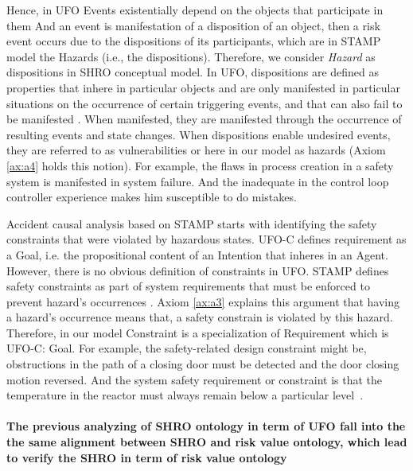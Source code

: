 \documentclass[sw]{iosart2x}
\newcommand{\COMMENT}[1]{\hl{ \textnormal{#1}}}
\newcommand{\COMMENT}[2]{\hl{ \textnormal{#1} \textbf{comment:} \textit{#2}}\xspace}
\newcommand{\term}[1]{\textnormal{\textsf{#1}}}
\begin{document}
Hence, in UFO Events existentially depend on the objects that participate in them And an event is manifestation of a disposition of an object, then a risk event occurs due to the dispositions of its participants, which are in STAMP model the \term{Hazards} (i.e., the dispositions). Therefore, we consider \emph{Hazard} as dispositions in SHRO conceptual model. In UFO, dispositions are defined as properties that inhere in particular objects and are only manifested in particular situations on the occurrence of certain triggering events, and that can also fail to be manifested \cite{Guizzardi2014}. When manifested, they are manifested through the occurrence of resulting events and state changes. When dispositions enable undesired events, they are referred to as vulnerabilities or here in our model as hazards (Axiom \ref{ax:a4} holds this notion). For example, the flaws in process creation in a safety system is manifested in system failure. And the inadequate in the control loop controller experience makes him susceptible to do mistakes. 

Accident causal analysis based on STAMP starts with identifying the safety constraints that were violated by hazardous states. \term{UFO-C} \cite{Guizzardi2010a} defines requirement as a Goal, i.e. the propositional content of an Intention that inheres in an Agent. However, there is no obvious definition of constraints in UFO. STAMP defines safety constraints as part of system requirements that must be enforced to prevent hazard's occurrences \cite{leveson2012engineering}. Axiom \ref{ax:a3} explains this argument that having a hazard's occurrence means that, a safety constrain is violated by this hazard. Therefore, in our model \term{Constraint} is a specialization of \term{Requirement} which is \term{UFO-C: Goal}. For example, 
the safety-related design constraint might be, obstructions in the path of a closing door must be detected and the door closing motion reversed. And the system safety requirement or constraint is that the temperature in the reactor must always remain below a particular level~\cite{leveson2012engineering}.
\paragraph{The previous analyzing of SHRO ontology in term of UFO fall into the the same alignment between SHRO and risk value ontology, which lead to verify the SHRO in term of risk value ontology}
\end{document}
